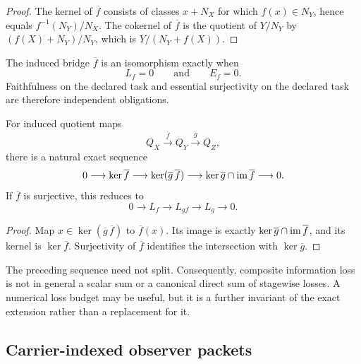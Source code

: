 \begin{proof}
The kernel of \(\overline f\) consists of classes \(x+N_X\) for which \(f(x)\in N_Y\), hence equals \(f^{-1}(N_Y)/N_X\).  The cokernel of \(\overline f\) is the quotient of \(Y/N_Y\) by \((f(X)+N_Y)/N_Y\), which is \(Y/(N_Y+f(X))\).
\end{proof}

\begin{corollary}
\label{cor:block18-semantic-equivalence-gate}
The induced bridge \(\overline f\) is an isomorphism exactly when
\[
 L_f=0
 \qquad\text{and}\qquad
 E_f=0.
\]
Faithfulness on the declared task and essential surjectivity on the declared task are therefore independent obligations.
\end{corollary}

\begin{theorem}
\label{thm:block18-loss-composition}
For induced quotient maps
\[
 Q_X\xrightarrow{\overline f}Q_Y\xrightarrow{\overline g}Q_Z,
\]
there is a natural exact sequence
\[
 0\longrightarrow\ker\overline f
 \longrightarrow\ker(\overline g\,\overline f)
 \longrightarrow\ker\overline g\cap\operatorname{im}\overline f
 \longrightarrow0.
\]
If \(\overline f\) is surjective, this reduces to
\[
 0\longrightarrow L_f
 \longrightarrow L_{gf}
 \longrightarrow L_g
 \longrightarrow0.
\]
\end{theorem}

\begin{proof}
Map \(x\in\ker(\overline g\,\overline f)\) to \(\overline f(x)\).  Its image is exactly \(\ker\overline g\cap\operatorname{im}\overline f\), and its kernel is \(\ker\overline f\).  Surjectivity of \(\overline f\) identifies the intersection with \(\ker\overline g\).
\end{proof}

\begin{boundary}
\label{bnd:block18-loss-extension}
The preceding sequence need not split.  Consequently, composite information loss is not in general a scalar sum or a canonical direct sum of stagewise losses.  A numerical loss budget may be useful, but it is a further invariant of the exact extension rather than a replacement for it.
\end{boundary}

\subsection{Carrier-indexed observer packets}
\label{subsec:block18-carrier-observer-packets}

